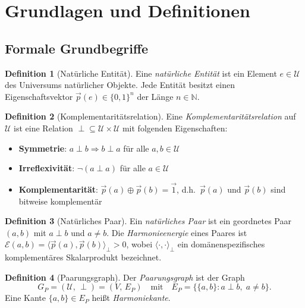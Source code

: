 ﻿\documentclass[a4paper,12pt]{article}
\theoremstyle{definition}
\newtheorem{definition}{Definition}
\begin{document}
\section{Grundlagen und Definitionen}
\label{sec:grundlagen}

\subsection{Formale Grundbegriffe}

\begin{definition}[Natürliche Entität]
	Eine \emph{natürliche Entität} ist ein Element $e \in \mathcal{U}$ des Universums
	natürlicher Objekte. Jede Entität besitzt einen Eigenschaftsvektor
	$\vec{p}(e) \in \{0,1\}^n$ der Länge $n \in \mathbb{N}$.
\end{definition}

\begin{definition}[Komplementaritätsrelation]
	Eine \emph{Komplementaritätsrelation} auf $\mathcal{U}$ ist eine Relation
	${\perp} \subseteq \mathcal{U} \times \mathcal{U}$ mit folgenden Eigenschaften:
	\begin{itemize}
		\item \textbf{Symmetrie}: $a \perp b \Rightarrow b \perp a$ für alle $a, b \in \mathcal{U}$
		\item \textbf{Irreflexivität}: $\neg(a \perp a)$ für alle $a \in \mathcal{U}$
		\item \textbf{Komplementarität}: $\vec{p}(a) \oplus \vec{p}(b) = \vec{1}$,
		d.h.\ $\vec{p}(a)$ und $\vec{p}(b)$ sind bitweise komplementär
	\end{itemize}
\end{definition}

\begin{definition}[Natürliches Paar]
	Ein \emph{natürliches Paar} ist ein geordnetes Paar $(a, b)$ mit $a \perp b$ und $a \neq b$.
	Die \emph{Harmonieenergie} eines Paares ist
	$\mathcal{E}(a, b) = \langle \vec{p}(a), \vec{p}(b) \rangle_\perp > 0$,
	wobei $\langle \cdot, \cdot \rangle_\perp$ ein domänenspezifisches komplementäres
	Skalarprodukt bezeichnet.
\end{definition}

\begin{definition}[Paarungsgraph]
	Der \emph{Paarungsgraph} ist der Graph
	\[
		G_P = (\mathcal{U},\, {\perp}) = (V,\, E_P)
		\quad\text{mit}\quad
		E_P = \{\{a, b\} : a \perp b,\; a \neq b\}.
	\]
	Eine Kante $\{a,b\} \in E_P$ heißt \emph{Harmoniekante}.
\end{definition}
\end{document}
